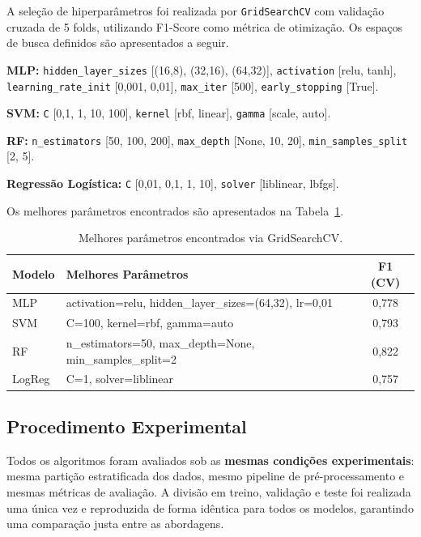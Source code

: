 \documentclass[conference]{IEEEtran}
\begin{document}
A sele\c{c}\~ao de hiperpar\^{a}metros foi realizada por \texttt{GridSearchCV} com valida\c{c}\~ao cruzada de 5 folds, utilizando F1-Score como m\'{e}trica de otimiza\c{c}\~ao. Os espa\c{c}os de busca definidos s\~ao apresentados a seguir.

\textbf{MLP:} \texttt{hidden\_layer\_sizes} [(16,8), (32,16), (64,32)], \texttt{activation} [relu, tanh], \texttt{learning\_rate\_init} [0,001, 0,01], \texttt{max\_iter} [500], \texttt{early\_stopping} [True].

\textbf{SVM:} \texttt{C} [0,1, 1, 10, 100], \texttt{kernel} [rbf, linear], \texttt{gamma} [scale, auto].

\textbf{RF:} \texttt{n\_estimators} [50, 100, 200], \texttt{max\_depth} [None, 10, 20], \texttt{min\_samples\_split} [2, 5].

\textbf{Regress\~ao Log\'{i}stica:} \texttt{C} [0,01, 0,1, 1, 10], \texttt{solver} [liblinear, lbfgs].

Os melhores par\^{a}metros encontrados s\~ao apresentados na Tabela~\ref{tab:parametros}.

\begin{table}[H]
\caption{Melhores par\^{a}metros encontrados via GridSearchCV.}
\label{tab:parametros}
\centering
\scriptsize
\setlength{\tabcolsep}{2pt}
\begin{tabular}{@{}lp{4.8cm}c@{}}
\toprule
Modelo & Melhores Par\^{a}metros & F1 (CV) \\
\midrule
MLP & activation=relu, hidden\_layer\_sizes=(64,32), lr=0,01 & 0,778 \\
SVM & C=100, kernel=rbf, gamma=auto & 0,793 \\
RF & n\_estimators=50, max\_depth=None, min\_samples\_split=2 & 0,822 \\
LogReg & C=1, solver=liblinear & 0,757 \\
\bottomrule
\end{tabular}
\end{table}

\subsection{Procedimento Experimental}

Todos os algoritmos foram avaliados sob as \textbf{mesmas condi\c{c}\~oes experimentais}: mesma parti\c{c}\~ao estratificada dos dados, mesmo pipeline de pr\'{e}-processamento e mesmas m\'{e}tricas de avalia\c{c}\~ao. A divis\~ao em treino, valida\c{c}\~ao e teste foi realizada uma \'{u}nica vez e reproduzida de forma id\^{e}ntica para todos os modelos, garantindo uma compara\c{c}\~ao justa entre as abordagens.
\end{document}
